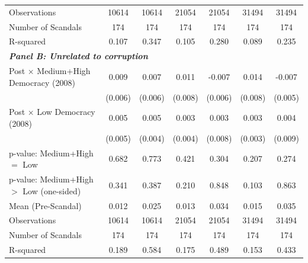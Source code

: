 {\begin{tabular}{l*{6}{c}}
Observations&       10614         &       10614         &       21054         &       21054         &       31494         &       31494         \\
Number of Scandals&         174         &         174         &         174         &         174         &         174         &         174         \\
R-squared   &       0.107         &       0.347         &       0.105         &       0.280         &       0.089         &       0.235         \\
\midrule
\multicolumn{7}{l}{\textbf{\textit{Panel B: Unrelated to corruption}}} \\
Post $\times$ Medium+High Democracy (2008)&       0.009         &       0.007         &       0.011         &      -0.007         &       0.014\sym{*}  &      -0.007         \\
&     (0.006)         &     (0.006)         &     (0.008)         &     (0.006)         &     (0.008)         &     (0.005)         \\
Post $\times$ Low Democracy (2008)&       0.005         &       0.005         &       0.003         &       0.003         &       0.003         &       0.004         \\
&     (0.005)         &     (0.004)         &     (0.004)         &     (0.008)         &     (0.003)         &     (0.009)         \\
\midrule
p-value: Medium+High $=$ Low&       0.682         &       0.773         &       0.421         &       0.304         &       0.207         &       0.274         \\
p-value: Medium+High $>$ Low (one-sided)&       0.341         &       0.387         &       0.210         &       0.848         &       0.103         &       0.863         \\
Mean (Pre-Scandal)&       0.012         &       0.025         &       0.013         &       0.034         &       0.015         &       0.035         \\
Observations&       10614         &       10614         &       21054         &       21054         &       31494         &       31494         \\
Number of Scandals&         174         &         174         &         174         &         174         &         174         &         174         \\
R-squared   &       0.189         &       0.584         &       0.175         &       0.489         &       0.153         &       0.433         \\
\bottomrule
\end{tabular}
}
